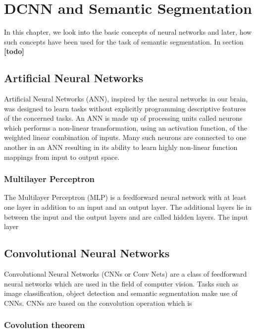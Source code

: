
\chapter{DCNN and Semantic Segmentation}

	In this chapter, we look into the basic concepts of neural networks and later, how such concepts have been used for the task of semantic segmentation. In section  \textbf{[todo]}

\section{Artificial Neural Networks}

Artificial Neural Networks (ANN), inspired by the neural networks in our brain, was designed to learn tasks without explicitly programming descriptive features of the concerned tasks. An ANN is made up of processing units called neurons which performs a non-linear transformation, using an activation function, of the weighted linear combination of inputs.  Many such neurons are connected to one another in an ANN resulting in its ability to learn highly non-linear function mappings from input to output space. 


\subsection{Multilayer Perceptron}

The Multilayer Perceptron (MLP) is a feedforward neural network with at least one layer in addition to an input and an output layer. The additional layers lie in between the input and the output layers and are called hidden layers. The input layer 

\section{Convolutional Neural Networks}

Convolutional Neural Networks (CNNs or Conv Nets) are a class of feedforward neural networks which are used in the field of computer vision. Tasks such as image classification, object detection and semantic segmentation make use of CNNs. CNNs are based on the convolution operation which is 

\subsection{Covolution theorem}

